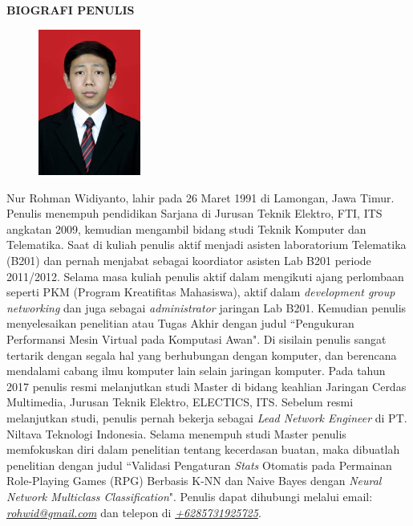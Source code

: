 \begin{center}
\large\textbf{BIOGRAFI PENULIS}
\end{center}
\vspace{1ex}

\begin{figure}
	\centering
	\vspace{-3ex}	
	\includegraphics[width=0.3\textwidth]{img/aku.jpg}
	\vspace{-4ex}
\end{figure}

\noindent Nur Rohman Widiyanto, lahir pada 26 Maret 1991 di Lamongan, Jawa Timur.
Penulis menempuh pendidikan Sarjana di Jurusan Teknik Elektro, FTI, ITS angkatan 2009, kemudian mengambil bidang studi Teknik Komputer dan Telematika. Saat di kuliah penulis aktif menjadi asisten laboratorium Telematika (B201) dan pernah menjabat sebagai koordiator asisten Lab B201 periode 2011/2012. Selama masa kuliah penulis aktif dalam mengikuti ajang perlombaan seperti PKM (Program Kreatifitas Mahasiswa), aktif dalam \textit{development group networking} dan juga sebagai \textit{administrator} jaringan Lab B201. Kemudian penulis menyelesaikan penelitian atau Tugas Akhir dengan judul ``Pengukuran Performansi Mesin Virtual pada Komputasi Awan". Di sisilain penulis sangat tertarik dengan segala hal yang berhubungan dengan komputer, dan berencana mendalami cabang ilmu komputer lain selain jaringan komputer. Pada tahun 2017 penulis resmi melanjutkan studi Master di bidang keahlian Jaringan Cerdas Multimedia, Jurusan Teknik Elektro, ELECTICS, ITS. Sebelum resmi melanjutkan studi, penulis pernah bekerja sebagai \textit{Lead Network Engineer} di PT. Niltava Teknologi Indonesia. Selama menempuh studi Master penulis memfokuskan diri dalam penelitian tentang kecerdasan buatan, maka dibuatlah penelitian dengan judul ``Validasi Pengaturan \textit{Stats} Otomatis pada Permainan Role-Playing Games (RPG) Berbasis K-NN dan Naive Bayes dengan \textit{Neural Network Multiclass Classification}". Penulis dapat dihubungi melalui email: \underline{\textit{rohwid@gmail.com}} dan telepon di \underline{\textit{+6285731925725}}.